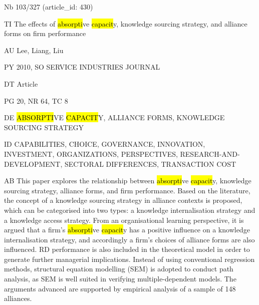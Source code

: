 \documentclass[a4paper]{article}
\begin{document}
\vspace*{-2cm}
Nb \tabto{0cm}103/327 (article\_id: 430)\par
TI \tabto{0cm}The effects of \hl{absorpti}ve \hl{capacit}y, knowledge sourcing strategy, and alliance forms on firm performance\par
AU \tabto{0cm}Lee, Liang, Liu\par
PY \tabto{0cm}2010, SO SERVICE INDUSTRIES JOURNAL\par
DT \tabto{0cm}Article\par
PG \tabto{0cm}20, NR 64, TC 8\par
DE \tabto{0cm}\hl{ABSORPTI}VE \hl{CAPACIT}Y, ALLIANCE FORMS, KNOWLEDGE SOURCING STRATEGY\par
ID \tabto{0cm}CAPABILITIES, CHOICE, GOVERNANCE, INNOVATION, INVESTMENT, ORGANIZATIONS, PERSPECTIVES, RESEARCH-AND-DEVELOPMENT, SECTORAL DIFFERENCES, TRANSACTION COST\par
AB \tabto{0cm}This paper explores the relationship between \hl{absorpti}ve \hl{capacit}y, knowledge sourcing strategy, alliance forms, and firm performance. Based on the literature, the concept of a knowledge sourcing strategy in alliance contexts is proposed, which can be categorised into two types: a knowledge internalisation strategy and a knowledge access strategy. From an organisational learning perspective, it is argued that a firm's \hl{absorpti}ve \hl{capacit}y has a positive influence on a knowledge internalisation strategy, and accordingly a firm's choices of alliance forms are also influenced. RD performance is also included in the theoretical model in order to generate further managerial implications. Instead of using conventional regression methods, structural equation modelling (SEM) is adopted to conduct path analysis, as SEM is well suited in verifying multiple-dependent models. The arguments advanced are supported by empirical analysis of a sample of 148 alliances.\par
\clearpage
\end{document}
